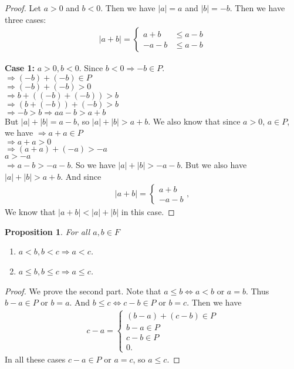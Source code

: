 \documentclass[12pt]{amsbook}
\theoremstyle{plain}
\numberwithin{section}{chapter}
\numberwithin{equation}{chapter}
\newtheorem{Prop}[theorem]{Proposition}
\theoremstyle{definition}
\theoremstyle{remark}
\theoremstyle{plain}
\newcommand{\bee}{\begin{equation}\begin{aligned}}
\newcommand{\eee}{\end{aligned}\end{equation}}
\renewcommand{\leq}{\leqslant}
\begin{document}
\begin{proof}
Let $a > 0$ and $b < 0$. Then we have $|a| = a$ and $|b| = -b$. Then we have three cases:
\bee
|a + b| = \begin{cases}
a + b & \leq a - b\\
-a - b & \leq a - b
\end{cases}
\eee

\textbf{Case 1:} $a > 0, b < 0$. Since $b < 0 \Rightarrow -b \in P$. \\
$\Rightarrow (-b) + (-b) \in P$\\
$\Rightarrow (-b) + (-b) > 0$\\
$\Rightarrow b + ((-b) + (-b)) > b$\\
$\Rightarrow (b + (-b)) + (-b) > b$\\
$\Rightarrow -b > b \Rightarrow a a - b > a + b$\\
But $|a| + |b| = a - b$, so $|a| + |b| > a + b$. We also know that since $a > 0$, $a \in P$, we have
$\Rightarrow a + a \in P$\\
$\Rightarrow a + a > 0$\\
$\Rightarrow (a + a) + (-a) > -a$\\
$a > -a$\\
$\Rightarrow a - b > -a - b$. So we have $|a| + |b| > -a - b$. But we also have $|a| + |b| > a + b$. And since 
\bee
|a + b| = \begin{cases}
a + b\\
-a - b
\end{cases},
\eee
We know that $|a + b| < |a| + |b|$ in this case. 
\end{proof}

\begin{Prop}
For all $a,b \in F$
\begin{enumerate}[label=\roman*)]
\item $a < b,b < c \Rightarrow a < c$. 
\item $a \leq b,b \leq c \Rightarrow a\leq c$. 
\end{enumerate}
\end{Prop}
\begin{proof}
We prove the second part. Note that $a \leq b \Leftrightarrow a < b$ or $a = b$. Thus $b - a \in P$ or $b = a$. And $b \leq c \Leftrightarrow c - b \in P$ or $b = c$. Then we have 
\bee
c - a = \begin{cases}
(b - a) + (c - b) \in P\\
b - a \in P\\
c - b \in P\\
0.
\end{cases}
\eee
In all these cases $c - a \in P$ or $a = c$, so $a \leq c$. 
\end{proof}
\end{document}

